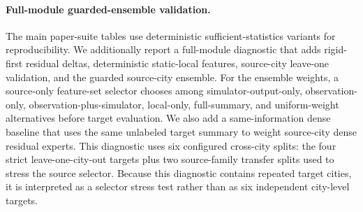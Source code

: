 \paragraph{Full-module guarded-ensemble validation.}
The main paper-suite tables use deterministic sufficient-statistics variants for reproducibility.
We additionally report a full-module diagnostic that adds rigid-first residual deltas, deterministic static-local features, source-city leave-one validation, and the guarded source-city ensemble.
For the ensemble weights, a source-only feature-set selector chooses among simulator-output-only, observation-only, observation-plus-simulator, local-only, full-summary, and uniform-weight alternatives before target evaluation.
We also add a same-information dense \Htwo baseline that uses the same unlabeled target summary to weight source-city dense residual experts.
This diagnostic uses six configured cross-city splits: the four strict leave-one-city-out targets plus two source-family transfer splits used to stress the source selector.
Because this diagnostic contains repeated target cities, it is interpreted as a selector stress test rather than as six independent city-level targets.


